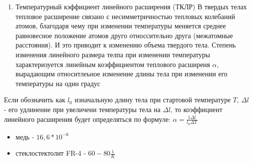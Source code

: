\documentclass{article}
\begin{document}
\begin{enumerate}
	\item Температурный кэффициент линейного расширения (ТКЛР)
В твердых телах тепловое расширение связано с несимметричностью тепловых колебаний атомов, благодаря чему при изменении температуры меняется среднее равновесное положение атомов друго относсительно друга (межатомные расстояния). И это приводит к изменению объема твердого тела.
Степень изменения линейного размера телпа при изменении температуры характеризуется линейным коэффициентом теплового расширеня $\alpha$, вырадающим относитлеьное изменение длины тела при изменении его температуры на один градус
\end{enumerate}
Если обозначить как $l_0$ изначальную длину тела при стартовой температуре $T$, $\Delta l$ - его удлинение при увеличени температуры тела на $\Delta l$, то коэффициент линейного расширения будет определяться по формуле:
$\alpha = \frac {1 \Delta l} {l_0 \Delta T}$
\begin{itemize}
	\item медь - $16,6 * 10^{-6}$
	\item стеклостектолит FR-4 - $60-80 \frac {1}{K}$
\end{itemize}
\end{document}
